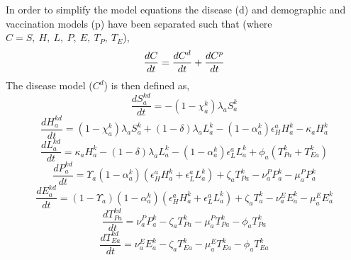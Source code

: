 \documentclass[11pt,twoside]{bristolthesis}
\begin{document}
  In order to simplify the model equations the disease (d) and demographic and vaccination models (p) have been separated such that (where \(C = S,\ H,\ L,\ P,\ E,\ T_P,\ T_E\)),
  \begin{equation}
  \frac{dC}{dt} =  \frac{dC^{d}}{dt} + \frac{dC^{p}}{dt} \\
    \label{eq:split-models}
  \end{equation}
  The disease model (\(C^d\)) is then defined as,
  \begin{equation}
  \frac{dS^{kd}_{a}}{dt} = - (1 - \chi^k_a)\lambda_a S^k_a 
    \label{eq:sus-model}
  \end{equation}
  \begin{equation}
  \frac{dH^{kd}_{a}}{dt} = (1 - \chi^k_a)\lambda_a S^k_a + (1 - \delta)\lambda_a L^k_{a} - (1 - \alpha^k_a)\epsilon^a_H H^{k}_{a} - \kappa_a H^{k}_{a}
    \label{eq:high-model}
  \end{equation}
  \begin{equation}
  \frac{dL^{kd}_{a}}{dt} =  \kappa_a H^{k}_{a} - (1 - \delta)\lambda_a L^k_{a} - (1 - \alpha^k_a) \epsilon^a_L L^{k}_{a} + \phi_a (T^{k}_{Pa} + T^{k}_{Ea})
    \label{eq:low-model}
  \end{equation}
  \begin{equation}
  \frac{dP^{kd}_a}{dt} =  \Upsilon_a(1 - \alpha^k_a)(\epsilon^a_HH^{k}_{a}  + \epsilon^a_LL^{k}_{a}) + \zeta_a T^{k}_{Pa} - \nu_a^P P^{k}_a - \mu^P_a P^{k}_a
    \label{eq:pul-model}
  \end{equation}
  \begin{equation}
  \frac{dE^{kd}_a}{dt} =  (1 - \Upsilon_a)(1 - \alpha^k_a)(\epsilon^a_HH^{k}_{a}  + \epsilon^a_LL^{k}_{a}) + \zeta_a T^{k}_a - \nu_a^E E^{k}_a - \mu^E_a E^{k}_a
    \label{eq:extra-pul-model}
  \end{equation}
  \begin{equation}
  \frac{dT^{kd}_{Pa}}{dt} = \nu_a^P P^{k}_a - \zeta_a T^{k}_{Pa} - \mu^P_a T^{k}_{Pa} - \phi_a T^{k}_{Pa}
    \label{eq:pul-treat-model}
  \end{equation}
  \begin{equation}
  \frac{dT^{kd}_{Ea}}{dt} = \nu_a^E E^{k}_a - \zeta_a T^{k}_{Ea} - \mu^E_a T^{k}_{Ea} - \phi_a T^{k}_{Ea}
    \label{eq:extra-pul-treat-model}
  \end{equation}
\end{document}
